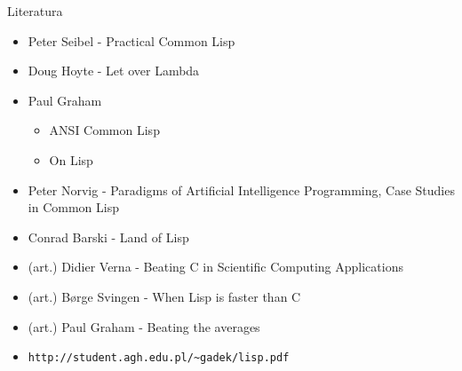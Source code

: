 \documentclass{beamer}
\begin{document}
\begin{frame}{Literatura}
	\begin{itemize}
		\item{Peter Seibel - Practical Common Lisp}
		\item{Doug Hoyte - Let over Lambda}
		\item{Paul Graham}
			\begin{itemize}
				\item{ANSI Common Lisp}
				\item{On Lisp}
			\end{itemize}
		\item{Peter Norvig - Paradigms of Artificial Intelligence
			Programming, Case Studies in Common Lisp}
		\item{Conrad Barski - Land of Lisp}
		\item{(art.) Didier Verna - Beating C in Scientific Computing
			Applications}
		\item{(art.) B\o rge Svingen - When Lisp is faster than C}
		\item{(art.) Paul Graham - Beating the averages}
		\item{\texttt{http://student.agh.edu.pl/\textasciitilde gadek/lisp.pdf}}
	\end{itemize}
\end{frame}
\end{document}
